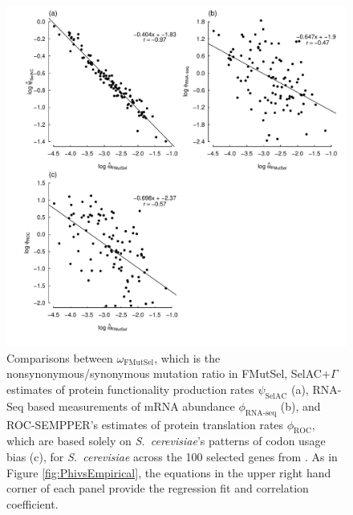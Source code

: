 \documentclass[12pt,letterpaper,fleqn]{article}
\newcommand{\selac}{SelAC\xspace}
\newcommand{\selacplusgamma}{SelAC$+\Gamma$\xspace}
\newcommand{\psihat}{\ensuremath{\hat{\psi}_{\text{\selac}}}\xspace}
\begin{document}
\begin{figure}[H]
  \centering
  \includegraphics[width=0.9\linewidth]{FIGURE_2_MutSelOmega_vs_Us_ROC_Scer_only.pdf}
  \caption{Comparisons between $\omega_{\text{FMutSel}}$, which is the nonsynonymous/synonymous mutation ratio in FMutSel, \selacplusgamma estimates of protein functionality production rates $\psihat$ (a), RNA-Seq based measurements of mRNA abundance $\phi_{\text{RNA-seq}}$ (b), and ROC-SEMPPER's estimates of protein translation rates $\phi_{\text{ROC}}$, which are based solely on \emph{S.~cerevisiae}'s patterns of codon usage bias (c), for \emph{S.~cerevisiae} across the 100 selected genes from \citet{SalichosAndRokas2013}.
    As in Figure \ref{fig:PhivsEmpirical}, the equations in the upper right hand corner of each panel provide the regression fit and correlation coefficient.
}
  \label{fig:OmegavsPsi}
\end{figure}
\end{document}

